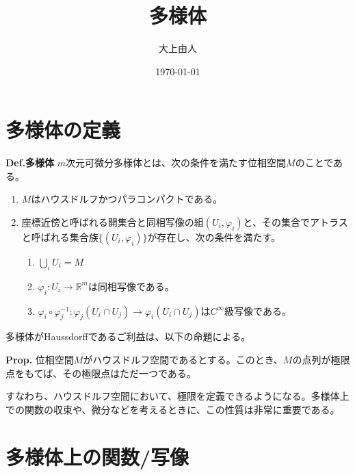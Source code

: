 \documentclass[a4paper,11pt]{jsarticle}
\numberwithin{equation}{section}
\begin{document}
\title{多様体}
\author{大上由人}
\date{\today}
\maketitle

\section{多様体の定義}
\begin{itembox}[l]{\textbf{Def.多様体}}
  $m$次元可微分多様体とは、次の条件を満たす位相空間$M$のことである。
  \begin{enumerate}
    \item $M$はハウスドルフかつパラコンパクトである。
    \item 座標近傍と呼ばれる開集合と同相写像の組$(U_i, \varphi_i)$と、その集合でアトラスと呼ばれる集合族$\{(U_i, \varphi_i)\}$が存在し、次の条件を満たす。
    \begin{enumerate}
      \item $\bigcup_i U_i = M$
      \item $\varphi_i: U_i \to \mathbb{R}^m$は同相写像である。
      \item $\varphi_i \circ \varphi_j^{-1}: \varphi_j(U_i \cap U_j) \to \varphi_i(U_i \cap U_j)$は$C^\infty$級写像である。
    \end{enumerate}
  \end{enumerate}
\end{itembox}

多様体がHaussdorffであるご利益は、以下の命題による。\\
\begin{itembox}[l]{\textbf{Prop.}}
  位相空間$M$がハウスドルフ空間であるとする。このとき、$M$の点列が極限点をもてば、その極限点はただ一つである。
\end{itembox}
すなわち、ハウスドルフ空間において、極限を定義できるようになる。多様体上での関数の収束や、微分などを考えるときに、この性質は非常に重要である。\\

\section{多様体上の関数/写像}
\end{document}
